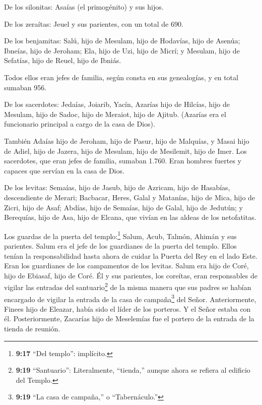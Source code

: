  De los silonitas: Asaías (el primogénito) y sus hijos.

 De los zeraítas: Jeuel y sus parientes, con un total de
690.

 De los benjamitas: Salú, hijo de Mesulam, hijo de Hodavías,
hijo de Asenúa;  Ibneías, hijo de Jeroham; Ela, hijo de Uzi,
hijo de Micrí; y Mesulam, hijo de Sefatías, hijo de Reuel, hijo de
Ibniás.

 Todos ellos eran jefes de familia, según consta en sus
genealogías, y en total sumaban 956.

 De los sacerdotes: Jedaías, Joiarib, Yacín, 
Azarías hijo de Hilcías, hijo de Mesulam, hijo de Sadoc, hijo de
Meraiot, hijo de Ajitub. (Azarías era el funcionario principal a cargo
de la casa de Dios).

 También Adaías hijo de Jeroham, hijo de Pasur, hijo de
Malquías, y Masai hijo de Adiel, hijo de Jazera, hijo de Mesulam, hijo
de Mesilemit, hijo de Imer.  Los sacerdotes, que eran jefes
de familia, sumaban 1.760. Eran hombres fuertes y capaces que servían en
la casa de Dios.

 De los levitas: Semaías, hijo de Jasub, hijo de Azricam,
hijo de Hasabías, descendiente de Merari;  Bacbacar, Heres,
Galal y Matanías, hijo de Mica, hijo de Zicri, hijo de Asaf;
 Abdías, hijo de Semaías, hijo de Galal, hijo de Jedutún; y
Berequías, hijo de Asa, hijo de Elcana, que vivían en las aldeas de los
netofatitas.

 Los guardas de la puerta del templo:\footnote{\textbf{9:17}
  ``Del templo'': implícito.} Salum, Acub, Talmón, Ahimán y sus
parientes. Salum era el jefe de los guardianes de la puerta del templo.
 Ellos tenían la responsabilidad hasta ahora de cuidar la
Puerta del Rey en el lado Este. Eran los guardianes de los campamentos
de los levitas.  Salum era hijo de Coré, hijo de Ebiasaf,
hijo de Coré. Él y sus parientes, los coreítas, eran responsables de
vigilar las entradas del santuario\footnote{\textbf{9:19} ``Santuario'':
  Literalmente, ``tienda,'' aunque ahora se refiera al edificio del
  Templo.} de la misma manera que sus padres se habían encargado de
vigilar la entrada de la casa de campaña\footnote{\textbf{9:19} ``La
  casa de campaña,'' o ``Tabernáculo.''} del Señor. 
Anteriormente, Finees hijo de Eleazar, había sido el líder de los
porteros. Y el Señor estaba con él.  Posteriormente,
Zacarías hijo de Meselemías fue el portero de la entrada de la tienda de
reunión.

